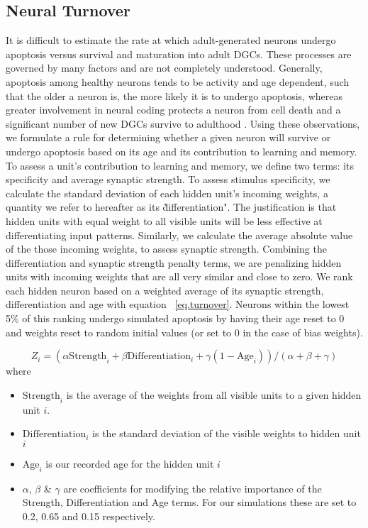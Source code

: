 \subsection{Neural Turnover}

It is difficult to estimate the rate at which adult-generated neurons undergo
apoptosis versus survival and maturation into adult \acp{DGC}. 
These processes are
governed by many factors 
\citep[see, e.g.,][]{apoptosis-review,why-neurons-die,cecchi-et-al-01,cameron-mckay-01} 
and are not completely understood.  
Generally, apoptosis among healthy neurons tends to be activity and age dependent, 
such that the older a neuron is, the more likely it is to undergo apoptosis, 
whereas greater involvement in neural coding protects a neuron from cell death 
\citep{why-neurons-die, cecchi-et-al-01} and a significant number of 
new \acp{DGC} survive to adulthood \citep{cameron-mckay-01}. 
Using these observations, we formulate a rule for determining whether a given
neuron will survive or undergo apoptosis 
based on its age and its contribution to learning and memory. 
To assess a unit's contribution to learning and memory, we define two terms: 
its specificity and average synaptic strength.
To assess stimulus specificity, we calculate the standard
deviation of each hidden unit's incoming weights, a quantity we refer to
hereafter as its \`\`differentiation".  
The justification is that hidden units with equal weight to all visible units
will be less effective at differentiating input patterns. 
Similarly, we calculate the average 
absolute value of the those incoming weights, to assess synaptic strength. 
Combining the differentiation and synaptic strength penalty terms, 
we are penalizing hidden units with incoming weights that are 
all very similar and close to zero. 
We rank each hidden neuron based on a weighted average of its 
synaptic strength, differentiation and age with equation ~\ref{eq.turnover}. 
Neurons within the lowest 5\% of this ranking undergo simulated apoptosis by
having their age reset to 0 and weights reset to random initial values (or
set to 0 in the case of bias weights). 

\begin{equation}
Z_i = (\alpha\mathrm{Strength}_i + \beta\mathrm{Differentiation}_i + \gamma(1 - \mathrm{Age}_i)) / (\alpha + \beta + \gamma) \label{eq.turnover}
\end{equation}
where
\begin{itemize}
\item $\mathrm{Strength}_i$ is the average of the weights from all visible units to a given hidden unit $i$. 
\item $\mathrm{Differentiation}_i$ is the standard deviation of the visible weights to hidden unit $i$
\item $\mathrm{Age}_i$ is our recorded age for the hidden unit $i$
\item $\alpha$, $\beta$ \& $\gamma$ are coefficients for modifying the
relative importance of the Strength, Differentiation and Age terms. 
For our simulations these are set to 0.2, 0.65 and 0.15 respectively. 
\end{itemize}

